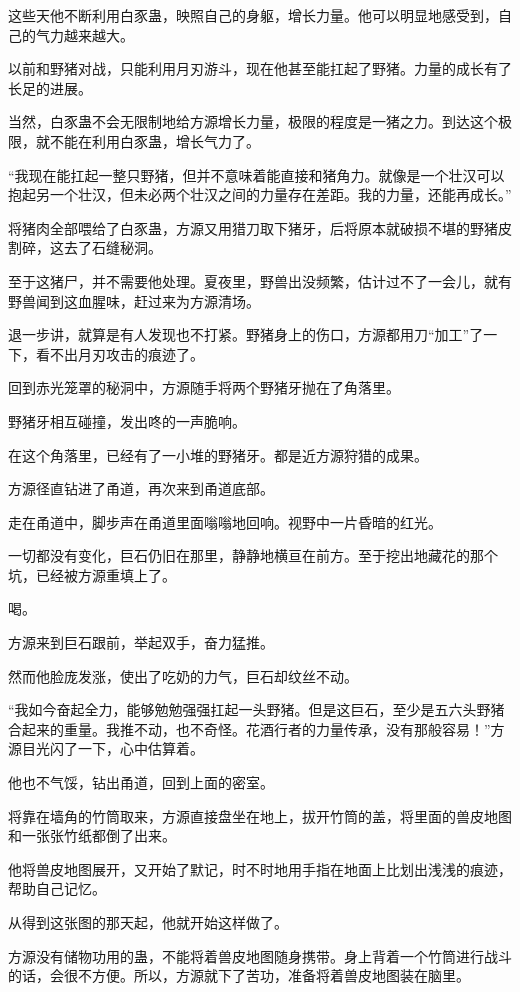 \begin{this_body}
这些天他不断利用白豕蛊，映照自己的身躯，增长力量。他可以明显地感受到，自己的气力越来越大。

以前和野猪对战，只能利用月刃游斗，现在他甚至能扛起了野猪。力量的成长有了长足的进展。

当然，白豕蛊不会无限制地给方源增长力量，极限的程度是一猪之力。到达这个极限，就不能在利用白豕蛊，增长气力了。

“我现在能扛起一整只野猪，但并不意味着能直接和猪角力。就像是一个壮汉可以抱起另一个壮汉，但未必两个壮汉之间的力量存在差距。我的力量，还能再成长。”

将猪肉全部喂给了白豕蛊，方源又用猎刀取下猪牙，后将原本就破损不堪的野猪皮割碎，这去了石缝秘洞。

至于这猪尸，并不需要他处理。夏夜里，野兽出没频繁，估计过不了一会儿，就有野兽闻到这血腥味，赶过来为方源清场。

退一步讲，就算是有人发现也不打紧。野猪身上的伤口，方源都用刀“加工”了一下，看不出月刃攻击的痕迹了。

回到赤光笼罩的秘洞中，方源随手将两个野猪牙抛在了角落里。

野猪牙相互碰撞，发出咚的一声脆响。

在这个角落里，已经有了一小堆的野猪牙。都是近方源狩猎的成果。

方源径直钻进了甬道，再次来到甬道底部。

走在甬道中，脚步声在甬道里面嗡嗡地回响。视野中一片昏暗的红光。

一切都没有变化，巨石仍旧在那里，静静地横亘在前方。至于挖出地藏花的那个坑，已经被方源重填上了。

喝。

方源来到巨石跟前，举起双手，奋力猛推。

然而他脸庞发涨，使出了吃奶的力气，巨石却纹丝不动。

“我如今奋起全力，能够勉勉强强扛起一头野猪。但是这巨石，至少是五六头野猪合起来的重量。我推不动，也不奇怪。花酒行者的力量传承，没有那般容易！”方源目光闪了一下，心中估算着。

他也不气馁，钻出甬道，回到上面的密室。

将靠在墙角的竹筒取来，方源直接盘坐在地上，拔开竹筒的盖，将里面的兽皮地图和一张张竹纸都倒了出来。

他将兽皮地图展开，又开始了默记，时不时地用手指在地面上比划出浅浅的痕迹，帮助自己记忆。

从得到这张图的那天起，他就开始这样做了。

方源没有储物功用的蛊，不能将着兽皮地图随身携带。身上背着一个竹筒进行战斗的话，会很不方便。所以，方源就下了苦功，准备将着兽皮地图装在脑里。


\end{this_body}
